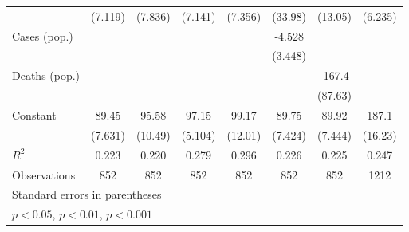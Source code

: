 \documentclass{article}
\begin{document}
{\begin{longtable}{l*{7}{c}}
                &  (7.119)         &  (7.836)         &  (7.141)         &  (7.356)         &  (33.98)         &  (13.05)         &  (6.235)         \\
Cases (pop.)    &                  &                  &                  &                  &   -4.528         &                  &                  \\
                &                  &                  &                  &                  &  (3.448)         &                  &                  \\
Deaths (pop.)   &                  &                  &                  &                  &                  &   -167.4         &                  \\
                &                  &                  &                  &                  &                  &  (87.63)         &                  \\
Constant        &    89.45\sym{***}&    95.58\sym{***}&    97.15\sym{***}&    99.17\sym{***}&    89.75\sym{***}&    89.92\sym{***}&    187.1\sym{***}\\
                &  (7.631)         &  (10.49)         &  (5.104)         &  (12.01)         &  (7.424)         &  (7.444)         &  (16.23)         \\
\hline
\(R^{2}\)       &    0.223         &    0.220         &    0.279         &    0.296         &    0.226         &    0.225         &    0.247         \\
Observations    &      852         &      852         &      852         &      852         &      852         &      852         &     1212         \\
\hline\hline
\multicolumn{8}{l}{\footnotesize Standard errors in parentheses}\\
\multicolumn{8}{l}{\footnotesize \sym{*} \(p<0.05\), \sym{**} \(p<0.01\), \sym{***} \(p<0.001\)}\\
\end{longtable}
}
\end{document}

